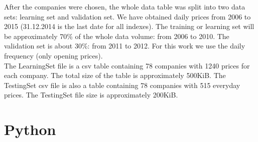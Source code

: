 \documentclass[
  twoside,
  11pt, a4paper,
  footinclude=true,
  headinclude=true,
  cleardoublepage=empty
]{scrreprt}
\begin{document}
    After the companies were chosen, the whole data table was split into two data sets: learning set and validation set. We have obtained daily prices from 2006 to 2015 (31.12.2014 is the last date for all indexes). The training or learning set will be approximately 70\% of the whole data volume: from 2006 to 2010. The validation set is about 30\%: from 2011 to 2012. For this work we use the daily frequency (only opening prices).\\
    The LearningSet file is a csv table containing 78 companies with 1240 prices for each company. The total size of the table is approximately 500KiB. The TestingSet csv file is also a table containing 78 companies with 515 everyday prices. The TestingSet file size is approximately 200KiB.\\
    
    
    \chapter{Python}
\end{document}
